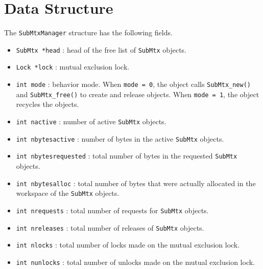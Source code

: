 \par
\section{Data Structure}
\label{section:SubMtxManager:dataStructure}
\par
\par
The {\tt SubMtxManager} structure has the following fields.
\begin{itemize}
\item
{\tt SubMtx *head} : 
     head of the free list of {\tt SubMtx} objects.
\item
{\tt Lock *lock} : mutual exclusion lock.
\item
{\tt int mode} : behavior mode. 
When {\tt mode = 0}, the object calls {\tt SubMtx\_new()}
and {\tt SubMtx\_free()} to create and release objects.
When {\tt mode = 1}, the object recycles the objects.
\item
{\tt int nactive} : number of active {\tt SubMtx} objects.
\item
{\tt int nbytesactive} : 
number of bytes in the active {\tt SubMtx} objects.
\item
{\tt int nbytesrequested} : 
total number of bytes in the requested {\tt SubMtx} objects.
\item
{\tt int nbytesalloc} : 
total number of bytes that were actually allocated in the workspace
of the {\tt SubMtx} objects.
\item
{\tt int nrequests} : 
total number of requests for {\tt SubMtx} objects.
\item
{\tt int nreleases} : 
total number of releases of {\tt SubMtx} objects.
\item
{\tt int nlocks} : 
total number of locks made on the mutual exclusion lock.
\item
{\tt int nunlocks} : 
total number of unlocks made on the mutual exclusion lock.
\end{itemize}
